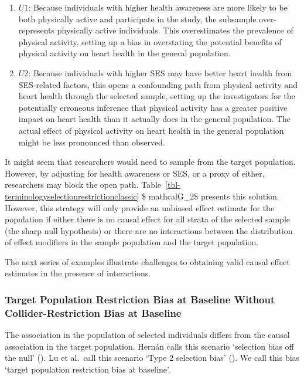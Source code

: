 \documentclass[
  single column]{article}
\begin{document}
\begin{enumerate}
\def\labelenumi{\arabic{enumi}.}
\item
  \textbf{\(U1\)}: Because individuals with higher health awareness are
  more likely to be both physically active and participate in the study,
  the subsample over-represents physically active individuals. This
  overestimates the prevalence of physical activity, setting up a bias
  in overstating the potential benefits of physical activity on heart
  health in the general population.
\item
  \textbf{\(U2\)}: Because individuals with higher SES may have better
  heart health from SES-related factors, this opens a confounding path
  from physical activity and heart health through the selected sample,
  setting up the investigators for the potentially erroneous inference
  that physical activity has a greater positive impact on heart health
  than it actually does in the general population. The actual effect of
  physical activity on heart health in the general population might be
  less pronounced than observed.
\end{enumerate}

It might seem that researchers would need to sample from the target
population. However, by adjusting for health awareness or SES, or a
proxy of either, researchers may block the open path.
Table~\ref{tbl-terminologyselectionrestrictionclassic} \$ mathcalG\_2\$
presents this solution. However, this strategy will only provide an
unbiased effect estimate for the population if either there is no causal
effect for all strata of the selected sample (the sharp null hypothesis)
or there are no interactions between the distribution of effect
modifiers in the sample population and the target population.

The next series of examples illustrate challenges to obtaining valid
causal effect estimates in the presence of interactions.

\subsubsection{Target Population Restriction Bias at Baseline Without
Collider-Restriction Bias at
Baseline}\label{target-population-restriction-bias-at-baseline-without-collider-restriction-bias-at-baseline}

\begin{table}

\caption{\label{tbl-terminologyselectionrestrictionbaseline}The
association in the population of selected individuals differs from the
causal association in the target population. Hernán calls this scenario
`selection bias off the null' (). Lu et al.~call this scenario `Type 2 selection bias'
(). We call this bias
`target population restriction bias at baseline'.}

\centering{

\terminologyselectionrestrictionbaseline

}

\end{table}%
\end{document}
